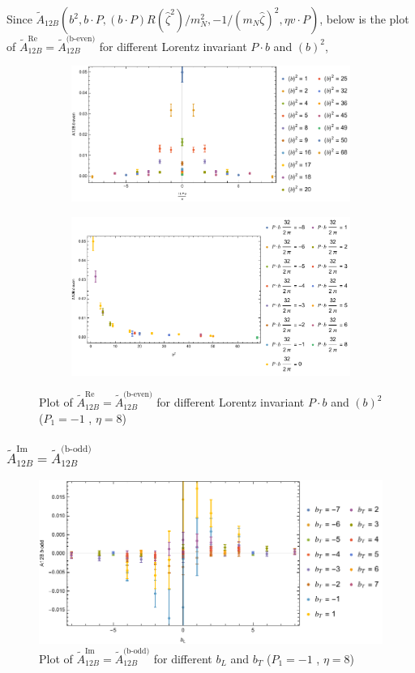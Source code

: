 \documentclass[]{article}
\numberwithin{equation}{section}
\newcommand{\tcdot}{{\cdot}}
\newcommand{\tAmp}{\widetilde{A}}
\newcommand{\tAmp}{\ensuremath{\widetilde{A}^{(+)}}}
\newcommand{\bvec}{b}
\newcommand{\mN}{m_N}
\newcommand{\zetahat}{{\hat \zeta}}
\begin{document}
Since $\tAmp_{12B}(\bvec^2,\bvec \tcdot P,(\bvec \tcdot P) R(\zetahat^2)/\mN^2,-1/(\mN\zetahat)^2,\eta v \tcdot P)$, below is the plot of $\tAmp^{\text{Re}}_{12B}=\tAmp^{\text{(b-even)}}_{12B}$ for different Lorentz invariant $P\cdot b$ and $(b)^2$,
\begin{figure}[h!]
     \centering
     \begin{subfigure}[b]{0.45\textwidth}
         \centering
         \includegraphics[width=\textwidth]{bP_A12B_b_even_P1_-1_eta_8.pdf}
     \end{subfigure}
     \begin{subfigure}[b]{0.45\textwidth}
         \centering
         \includegraphics[width=\textwidth]{bsq_A12B_b_even_P1_-1_eta_8.pdf}
     \end{subfigure}
        \caption{Plot of $\tAmp^{\text{Re}}_{12B}=\tAmp^{\text{(b-even)}}_{12B}$ for different Lorentz invariant $P\cdot b$ and $(b)^2$  ($P_{1} = -1$ , $\eta=8$)}
\end{figure}

\subsubsection{$\tAmp^{\text{Im}}_{12B}=\tAmp^{\text{(b-odd)}}_{12B}$}
\begin{figure}[h!]
    \centering
    \includegraphics[width=0.45\linewidth]{bLbT_A12B_b_odd_P1_-1_eta_8.pdf}
    \caption{Plot of  $\tAmp^{\text{Im}}_{12B}=\tAmp^{\text{(b-odd)}}_{12B}$ for different $b_{L}$ and $b_{T}$  ($P_{1} = -1$ , $\eta=8$)}
\end{figure}
\end{document}
